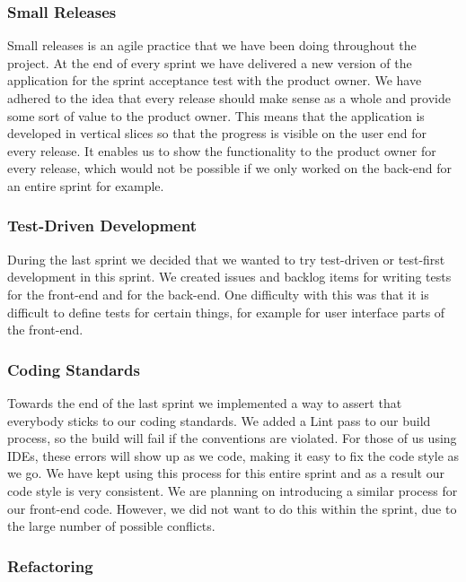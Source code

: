 \documentclass[14]{article}
\begin{document}
\subsubsection{Small Releases}

Small releases is an agile practice that we have been doing throughout the project. At the end of every sprint we have delivered a new version of the application for the sprint acceptance test with the product owner. We have adhered to the idea that every release should make sense as a whole and provide some sort of value to the product owner. This means that the application is developed in vertical slices so that the progress is visible on the user end for every release. It enables us to show the functionality to the product owner for every release, which would not be possible if we only worked on the back-end for an entire sprint for example.

\subsubsection{Test-Driven Development}

During the last sprint we decided that we wanted to try test-driven or test-first development in this sprint. We created issues and backlog items for writing tests for the front-end and for the back-end. One difficulty with this was that it is difficult to define tests for certain things, for example for user interface parts of the front-end.


\subsubsection{Coding Standards}

Towards the end of the last sprint we implemented a way to assert that everybody sticks to our coding standards. We added a Lint pass to our build process, so the build will fail if the conventions are violated. For those of us using IDEs, these errors will show up as we code, making it easy to fix the code style as we go.
We have kept using this process for this entire sprint and as a result our code style is very consistent.
We are planning on introducing a similar process for our front-end code. However, we did not want to do this within the sprint, due to the large number of possible conflicts.

\subsubsection{Refactoring}
\end{document}
